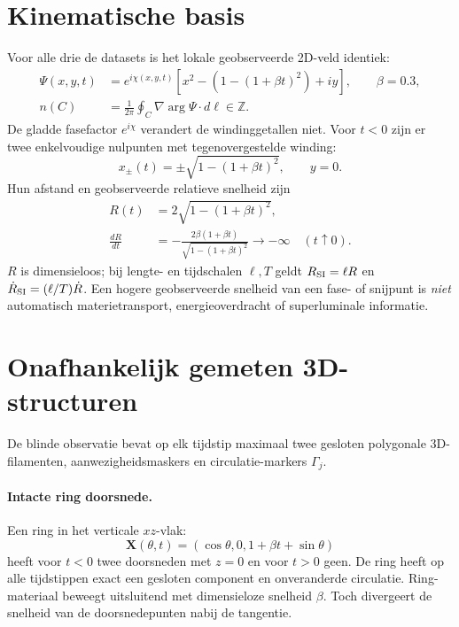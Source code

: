 \documentclass[11pt,a4paper]{article}
\begin{document}
\section{Kinematische basis}
Voor alle drie de datasets is het lokale geobserveerde 2D-veld identiek:
\begin{align}
\Psi(x,y,t)&=e^{i\chi(x,y,t)}\left[x^2-\left(1-(1+\beta t)^2\right)+iy\right],\qquad\beta=0.3,\\
 n(C)&=\frac{1}{2\pi}\oint_C\nabla\arg\Psi\cdot d\boldsymbol\ell\in\mathbb Z.
\end{align}
De gladde fasefactor $e^{i\chi}$ verandert de windinggetallen niet.
Voor $t<0$ zijn er twee enkelvoudige nulpunten met tegenovergestelde winding:
\begin{equation}
 x_{\pm}(t)=\pm\sqrt{1-(1+\beta t)^2},\qquad y=0.
\end{equation}
Hun afstand en geobserveerde relatieve snelheid zijn
\begin{align}
 R(t)&=2\sqrt{1-(1+\beta t)^2},\\
 \frac{dR}{dt}&=-\frac{2\beta(1+\beta t)}{\sqrt{1-(1+\beta t)^2}}\longrightarrow-\infty\quad(t\uparrow0).
\end{align}
$R$ is dimensieloos; bij lengte- en tijdschalen $\ell,T$ geldt
$R_{\rm SI}=\ell R$ en $\dot R_{\rm SI}=(\ell/T)\dot R$.
Een hogere geobserveerde snelheid van een fase- of snijpunt is \emph{niet}
automatisch materietransport, energieoverdracht of superluminale informatie.

\section{Onafhankelijk gemeten 3D-structuren}
De blinde observatie bevat op elk tijdstip maximaal twee gesloten polygonale
3D-filamenten, aanwezigheidsmaskers en circulatie-markers $\Gamma_j$.
\paragraph{Intacte ring doorsnede.}
Een ring in het verticale $xz$-vlak:
\begin{equation}
\mathbf X(\theta,t)=\left(\cos\theta,0,1+\beta t+\sin\theta\right)
\end{equation}
heeft voor $t<0$ twee doorsneden met $z=0$ en voor $t>0$ geen.
De ring heeft op alle tijdstippen exact een gesloten component en onveranderde
circulatie. Ring-materiaal beweegt uitsluitend met dimensieloze snelheid $\beta$.
Toch divergeert de snelheid van de doorsnedepunten nabij de tangentie.
\end{document}
